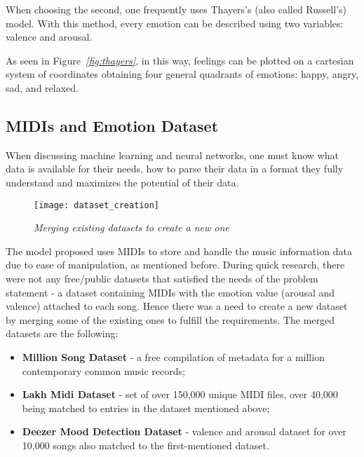 When choosing the second, one frequently uses Thayers's
(also called Russell's) model. With this method,
every emotion can be described using two variables: valence and arousal.


As seen in Figure\emph{~\ref{fig:thayers}}, in this way,
feelings can be plotted on a cartesian system of coordinates obtaining
four general quadrants of emotions: happy, angry, sad, and relaxed.

\vspace{1cm}


\subsection{MIDIs and Emotion Dataset}


When discussing machine learning and neural networks,
one must know what data is available for their needs,
how to parse their data in a format they fully understand and maximizes
the potential of their data.


\begin{wrapfigure}[11]{L}{0.5\textwidth}
  \centering
  \texttt{[image: dataset\_creation]}
  \caption{\emph{Merging existing datasets to create a new one}}
  \label{fig:dataset_creation}
\end{wrapfigure}
The model proposed uses MIDIs to store and handle the music information
data due to ease of manipulation, as mentioned before.
During quick research, there were not any free/public datasets
that satisfied the needs of the problem statement - a
dataset containing MIDIs with the emotion value (arousal and valence)
attached to each song. Hence there was a need to create a new dataset
by merging some of the existing ones to fulfill the requirements.
The merged datasets are the following:
\begin{itemize}
  \item{
        \textbf{Million Song Dataset} - a free compilation of metadata for a million contemporary common music records;\cite{themillion}
        }
  \item{
        \textbf{Lakh Midi Dataset} - set of over 150,000 unique MIDI files, over 40,000 being matched to entries in the dataset mentioned above;\cite{lakh}
        }
  \item{
        \textbf{Deezer Mood Detection Dataset} - valence and arousal dataset for over 10,000 songs also matched to the first-mentioned dataset.\cite{deezer}
        }
\end{itemize}



